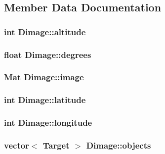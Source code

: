 \subsection{Member Data Documentation}
\hypertarget{classDimage_ad9ebd4c340098de74c0971be6161f194}{
\subsubsection[{altitude}]{\setlength{\rightskip}{0pt plus 5cm}int Dimage\-::altitude}}\label{classDimage_ad9ebd4c340098de74c0971be6161f194}
\hypertarget{classDimage_a6d13db78abfb30ba2829badef047a632}{
\subsubsection[{degrees}]{\setlength{\rightskip}{0pt plus 5cm}float Dimage\-::degrees}}\label{classDimage_a6d13db78abfb30ba2829badef047a632}
\hypertarget{classDimage_a0da4164eece652cf86fc8ec27e2df086}{
\subsubsection[{image}]{\setlength{\rightskip}{0pt plus 5cm}Mat Dimage\-::image}}\label{classDimage_a0da4164eece652cf86fc8ec27e2df086}
\hypertarget{classDimage_a518750ead775e0dc036fe5885069dbf2}{
\subsubsection[{latitude}]{\setlength{\rightskip}{0pt plus 5cm}int Dimage\-::latitude}}\label{classDimage_a518750ead775e0dc036fe5885069dbf2}
\hypertarget{classDimage_abf468948c7b45b33fe37e653ca96c33d}{
\subsubsection[{longitude}]{\setlength{\rightskip}{0pt plus 5cm}int Dimage\-::longitude}}\label{classDimage_abf468948c7b45b33fe37e653ca96c33d}
\hypertarget{classDimage_a63f52e6d093db216a710643fb9852af0}{
\subsubsection[{objects}]{\setlength{\rightskip}{0pt plus 5cm}vector$<$ {\bf Target} $>$ Dimage\-::objects}}\label{classDimage_a63f52e6d093db216a710643fb9852af0}
